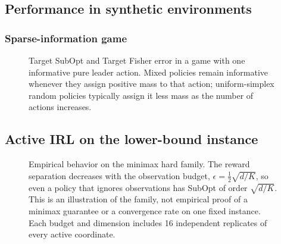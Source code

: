 \subsection{Performance in synthetic environments}

\subsubsection{Sparse-information game}

\begin{figure}[t]
  \centering
  \resizebox{\textwidth}{!}{%
  }
  \caption{Target SubOpt and Target Fisher error in a game with one informative
  pure leader action. Mixed policies remain informative whenever they assign
  positive mass to that action; uniform-simplex random policies typically assign
  it less mass as the number of actions increases.}
  \label{fig:appendix-sparse-information}
\end{figure}

\subsection{Active IRL on the lower-bound instance}

\begin{figure}[t]
  \centering
  \resizebox{\textwidth}{!}{%
  }
  \caption{Empirical behavior on the minimax hard family. The reward separation
  decreases with the observation budget, $\epsilon=\tfrac12\sqrt{d/K}$, so even
  a policy that ignores observations has SubOpt of order $\sqrt{d/K}$.
  This is an illustration of the family, not empirical proof of a minimax
  guarantee or a convergence rate on one fixed instance. Each budget and dimension
  includes 16 independent replicates of every active coordinate.}
  \label{fig:appendix-lower-bound}
\end{figure}
